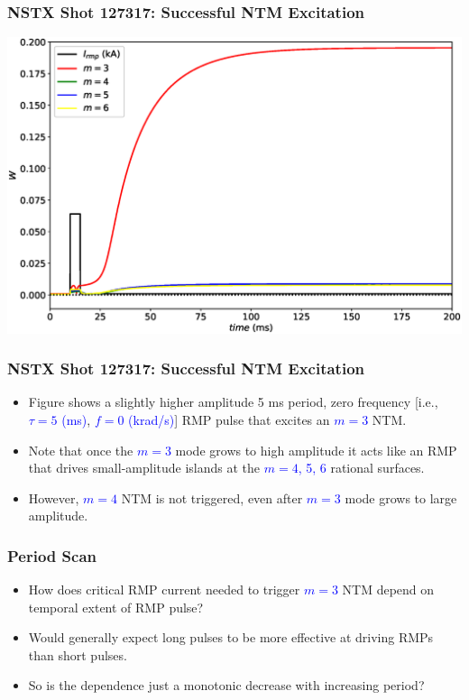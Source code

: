 \documentclass{beamer}
\newcommand{\blue}[1]{\textcolor{blue}{#1}}
\begin{document}
\begin{frame}
\frametitle{NSTX Shot 127317: Successful  NTM Excitation}
\begin{center}
\includegraphics[width=\textwidth]{Waveform1.eps}
\end{center}

\end{frame}

\begin{frame}
\frametitle{NSTX Shot 127317: Successful NTM Excitation}
\begin{itemize}
\item Figure shows a slightly higher amplitude 5 ms period, zero frequency [i.e., \blue{$\tau=5$ (ms)}, \blue{$f= 0$ (krad/s)}] RMP
pulse that  excites an \blue{$m=3$} NTM. 
\item Note that once the \blue{$m=3$} mode grows to high amplitude it acts like an RMP that drives small-amplitude
islands at the \blue{$m=4$, 5, 6} rational surfaces.
\item However, \blue{$m=4$} NTM is not triggered, even after \blue{$m=3$} mode grows to large amplitude. 
\end{itemize}
\end{frame}

\begin{frame}
\frametitle{Period Scan}
\begin{itemize}
\item How does critical RMP current needed to trigger \blue{$m=3$} NTM depend on temporal extent of
RMP pulse? 
\item Would generally expect long pulses to be more effective at driving RMPs than short pulses.
\item So is the dependence just a monotonic decrease with increasing period?
\end{itemize}
\end{frame}
\end{document}

